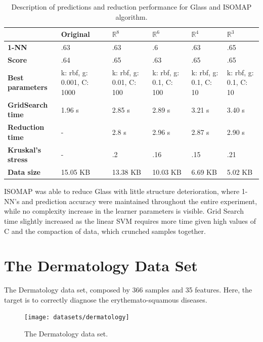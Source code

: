 \begin{table}[H]
	\centering
	
	\begin{tabular}{|p{.15\linewidth}|p{.12\linewidth}|p{.12\linewidth}|p{.12\linewidth}|p{.12\linewidth}|p{.12\linewidth}|}
		\hline
		& \textbf{Original} & $\mathbb{R}^8$ & $\mathbb{R}^6$ & $\mathbb{R}^4$ & $\mathbb{R}^3$ \\\hline
		\textbf{1-NN} & .63 & .63 & .6 & .63 & .65 \\\hline
		\textbf{Score} & .64 & .65 & .63 & .65 & .65 \\\hline
		\textbf{Best parameters} & k: rbf, g: 0.001, C: 1000 & k: rbf, g: 0.01, C: 100 & k: rbf, g: 0.1, C: 100 & k: rbf, g: 0.1, C: 10 & k: rbf, g: 0.1, C: 10\\\hline
		\textbf{GridSearch time} & 1.96 s & 2.85 s & 2.89 s & 3.21 s & 3.40 s \\\hline
		\textbf{Reduction time} & - & 2.8 s & 2.96 s & 2.87 s & 2.90 s \\\hline
		\textbf{Kruskal's stress} & - & .2 & .16 & .15 & .21 \\\hline
		\textbf{Data size} & 15.05 KB & 13.38 KB & 10.03 KB & 6.69 KB & 5.02 KB \\\hline
	\end{tabular}
	\captionsetup{justification=centering}
	\caption{Description of predictions and reduction performance for Glass and ISOMAP algorithm.}
\end{table}

ISOMAP was able to reduce Glass with little structure deterioration, where 1-NN's and prediction accuracy were maintained throughout the entire experiment, while no complexity increase in the learner parameters is visible. Grid Search time slightly increased as the linear SVM requires more time given high values of C and the compaction of data, which crunched samples together.

\clearpage
\section{The Dermatology Data Set}

The Dermatology data set, composed by 366 samples and 35 features. Here, the target is to correctly diagnose the erythemato-squamous diseases.
\newline\newline

\begin{figure}[H]
	\centering
	\texttt{[image: datasets/dermatology]}
	\captionsetup{justification=centering}
	\caption{The Dermatology data set.}
\end{figure}

